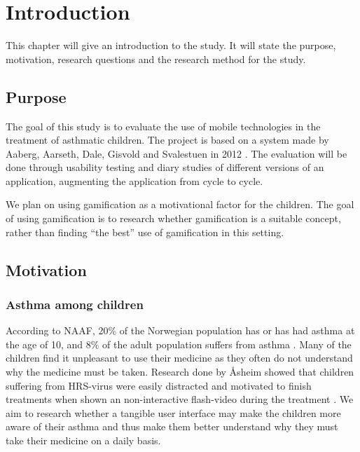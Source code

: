 \chapter{Introduction}
\label{chp:introduction}

This chapter will give an introduction to the study. It will state the purpose, motivation, research questions and the research method for the study. 

\section{Purpose}
\label{sec:purpose}
The goal of this study is to evaluate the use of mobile technologies in the treatment of asthmatic children. The project is based on a system made by Aaberg, Aarseth, Dale, Gisvold and Svalestuen in 2012 \cite{CustomerDriven}.
The evaluation will be done through usability testing and diary studies of different versions of an application, augmenting the application from cycle to cycle. 

We plan on using gamification as a motivational factor for the children. The goal of using gamification is to research whether gamification is a suitable concept, rather than finding ``the best'' use of gamification in this setting.


\section{Motivation}
\label{sec:motivation}

\subsection{Asthma among children}
According to NAAF, 20\% of the Norwegian population has or has had asthma at the age of 10, and 8\% of the adult population suffers from asthma \cite{NAAF}. Many of the children find it unpleasant to use their medicine as they often do not understand why the medicine must be taken. Research done by \r{A}sheim showed that children suffering from HRS-virus were easily distracted and motivated to finish treatments when shown an non-interactive flash-video during the treatment \cite{Asheim610877}. We aim to research whether a tangible user interface may make the children more aware of their asthma and thus make them better understand why they must take their medicine on a daily basis. 


